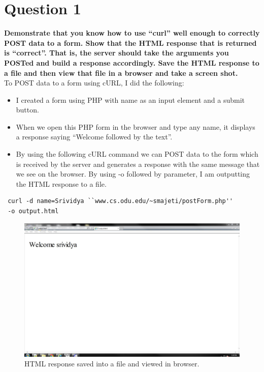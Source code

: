 \chapter{Question 1}
\label{intro}

\textbf{Demonstrate that you know how to use ``curl'' well enough to correctly POST data to a form. Show that the HTML response that is returned is ``correct''.  That is, the server should take the arguments you POSTed and build a response accordingly.  Save the HTML response to a file and then view that file in a browser and take a screen shot.}\\

To POST data to a form using cURL, I did the following:
\begin{itemize}
\item I created a form using PHP with name as an input element and a submit button.

\item When we open this PHP form in the browser and type any name, it displays a response saying ``Welcome followed by the text''.

\item By using the following cURL command we can POST data to the form which is received by the server and generates a response with the same message that we see on the browser. By using -o followed by parameter, I am outputting the HTML response to a file.
\end{itemize}
\begin{verbatim}
 curl -d name=Srividya ``www.cs.odu.edu/~smajeti/postForm.php'' 
 -o output.html
\end{verbatim}


\newpage



\begin{figure}[h!]
\begin{center}


\includegraphics[scale=0.30, keepaspectratio=true]{figures/q1screenshot.JPG}
\caption{HTML response saved into a file and viewed in browser.}
\label{mcpon_navy_mil}
\end{center}
\end{figure}
